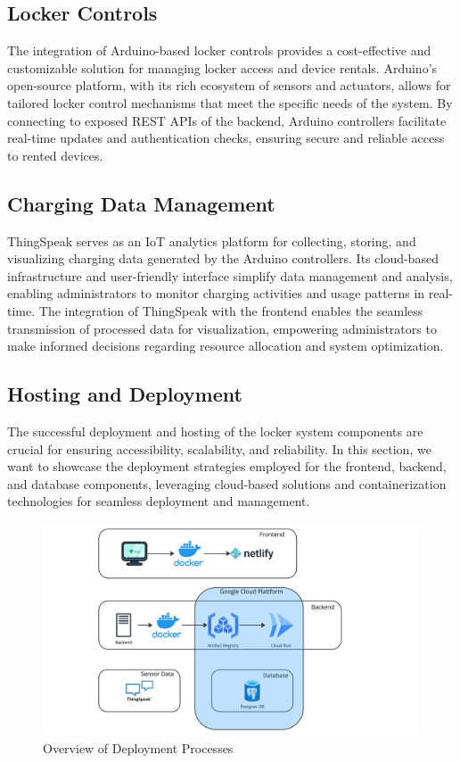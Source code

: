 \subsection{Locker Controls}
The integration of Arduino-based locker controls provides a cost-effective and customizable solution for managing locker access and device rentals. Arduino's open-source platform, with its rich ecosystem of sensors and actuators, allows for tailored locker control mechanisms that meet the specific needs of the system. By connecting to exposed REST APIs of the backend, Arduino controllers facilitate real-time updates and authentication checks, ensuring secure and reliable access to rented devices.

\subsection{Charging Data Management}
ThingSpeak serves as an IoT analytics platform for collecting, storing, and visualizing charging data generated by the Arduino controllers. Its cloud-based infrastructure and user-friendly interface simplify data management and analysis, enabling administrators to monitor charging activities and usage patterns in real-time. The integration of ThingSpeak with the frontend enables the seamless transmission of processed data for visualization, empowering administrators to make informed decisions regarding resource allocation and system optimization.

\subsection{Hosting and Deployment}
The successful deployment and hosting of the locker system components are crucial for ensuring accessibility, scalability, and reliability. In this section, we want to showcase the deployment strategies employed for the frontend, backend, and database components, leveraging cloud-based solutions and containerization technologies for seamless deployment and management.

\begin{figure}[h]
    \centering
    \includegraphics[width=\textwidth]{images/software_design_deployment}
    \caption{Overview of Deployment Processes}
    \label{fig:deployment_overview}
\end{figure}

